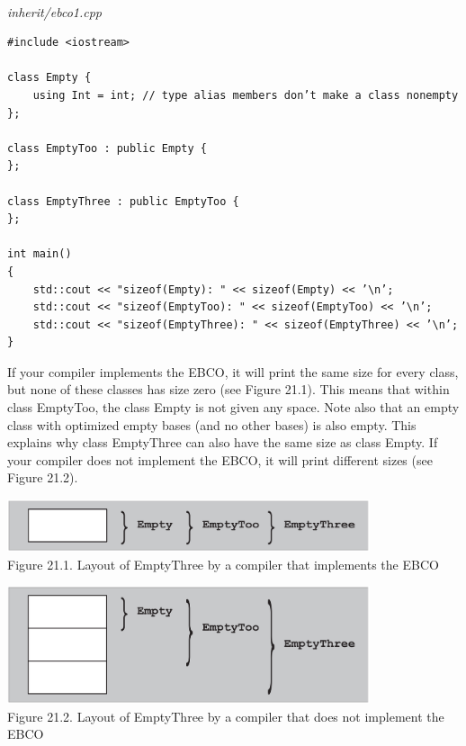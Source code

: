 \hspace*{\fill} \\ %
\noindent
\textit{inherit/ebco1.cpp}
\begin{lstlisting}[style=styleCXX]
#include <iostream>

class Empty {
	using Int = int; // type alias members don’t make a class nonempty
};

class EmptyToo : public Empty {
};

class EmptyThree : public EmptyToo {
};

int main()
{
	std::cout << "sizeof(Empty): " << sizeof(Empty) << ’\n’;
	std::cout << "sizeof(EmptyToo): " << sizeof(EmptyToo) << ’\n’;
	std::cout << "sizeof(EmptyThree): " << sizeof(EmptyThree) << ’\n’;
}
\end{lstlisting}

If your compiler implements the EBCO, it will print the same size for every class, but none of these classes has size zero (see Figure 21.1). This means that within class EmptyToo, the class Empty is not given any space. Note also that an empty class with optimized empty bases (and no other bases)  is also empty. This explains why class EmptyThree can also have the same size as class Empty. If your compiler does not implement the EBCO, it will print different sizes (see Figure 21.2).

\begin{center}
\includegraphics[width=0.8\textwidth]{content/3/chapter21/images/1.png} \\
Figure 21.1. Layout of EmptyThree by a compiler that implements the EBCO
\end{center}

\begin{center}
\includegraphics[width=0.8\textwidth]{content/3/chapter21/images/2.png} \\
Figure 21.2. Layout of EmptyThree by a compiler that does not implement the EBCO
\end{center}

